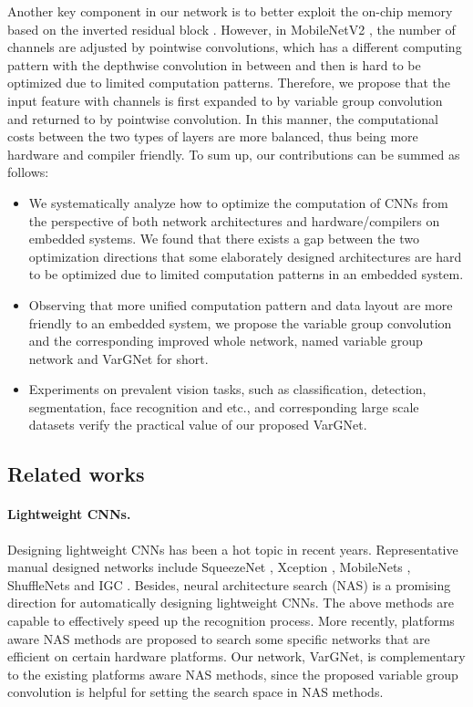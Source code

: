 \documentclass{article}
\begin{document}
Another key component in our network is to better exploit the on-chip memory based on the inverted residual block \cite{sandler2018mobilenetv2}. 
However, in MobileNetV2 \cite{sandler2018mobilenetv2}, the number of channels are adjusted by pointwise convolutions, which has a different computing pattern with the  depthwise convolution in between and then is hard to be optimized due to limited computation patterns. Therefore, we propose that the input feature with  channels is first expanded to  by variable group convolution and returned to  by pointwise convolution. In this manner, the computational costs between the two types of layers are more balanced, thus being more hardware and compiler friendly. To sum up, our contributions can be summed as follows:
\begin{itemize}
\item We systematically analyze how to optimize the computation of CNNs from the perspective of both network architectures and hardware/compilers on embedded systems. We found that there exists a gap between the two optimization directions that some elaborately designed architectures are hard to be optimized due to limited computation patterns in an embedded system.
\item Observing that more unified computation pattern and data layout are more friendly to an embedded system, we propose the variable group convolution and the corresponding improved whole network, named variable group network and VarGNet for short.
\item Experiments on prevalent vision tasks, such as classification, detection, segmentation, face recognition and etc., and corresponding large scale datasets verify the practical value of our proposed VarGNet.
\end{itemize}


\subsection{Related works}

\paragraph{Lightweight CNNs.}
Designing lightweight CNNs has been a hot topic in recent years. Representative manual designed networks include SqueezeNet \cite{2016_SqueezeNet}, Xception \cite{chollet2017xception}, MobileNets \cite{howard2017mobilenets, sandler2018mobilenetv2}, ShuffleNets \cite{zhang2018shufflenet, ma2018shufflenet} and IGC \cite{zhang2017interleaved, xie2018interleaved, sun2018igcv3}.
Besides, neural architecture search (NAS) \cite{zoph2016neural, pham2018efficient, Real2018Regularized, zoph2017learning, liu2018darts} is a promising direction for automatically designing lightweight CNNs. 
The above methods are capable to effectively speed up the recognition process. 
More recently, platforms aware NAS methods are proposed \cite{cai2018proxylessnas, fbnet, dai2018chamnet, stamoulis2019single} to search some specific networks that are efficient on certain hardware platforms. 
Our network, VarGNet, is complementary to the existing platforms aware NAS methods, since the proposed variable group convolution is helpful for setting the search space in NAS methods.
\end{document}
